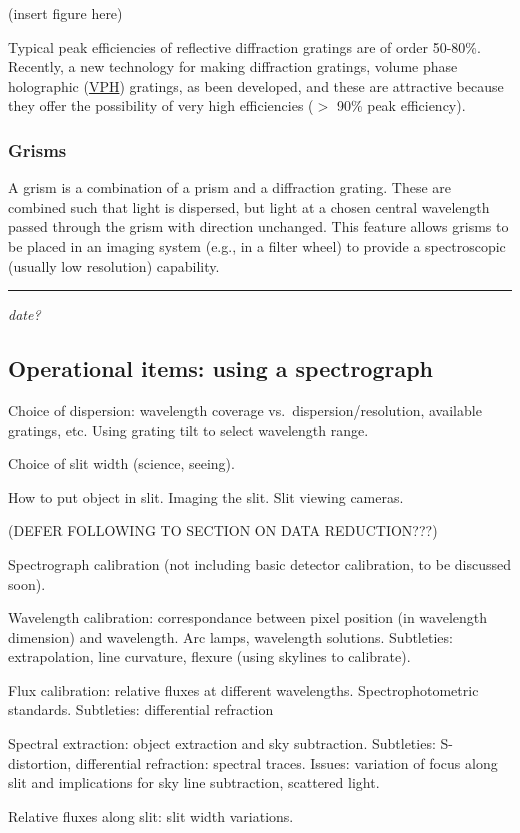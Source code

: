 \documentclass[12pt]{article}
\newcommand{\mydate}[1]{
    \begin{flushright}
        \rule{\textwidth}{0.4pt} %
        \small\hfill\textit{#1}
    \end{flushright}}
\begin{document}
(insert figure here)

Typical peak efficiencies of reflective diffraction gratings are of order
50-80\%. Recently, a new technology for making diffraction gratings, volume
phase holographic (\href{http://www.kosi.com/Holographic_Gratings/vph_ht_overview.php}
{VPH}) gratings, as been developed, and these are attractive because they offer
the possibility of very high efficiencies ($>$ 90\% peak efficiency).

\subsubsection{Grisms}
A grism is a combination of a prism and a diffraction grating. These
are combined such that light is dispersed, but light at a chosen
central wavelength passed through the grism with direction unchanged.
This feature allows grisms to be placed in an imaging system (e.g., in
a filter wheel) to provide a spectroscopic (usually low resolution)
capability.

\mydate{date?}
\subsection{Operational items: using a spectrograph}
Choice of dispersion: wavelength coverage vs.\ dispersion/resolution,
available gratings, etc. Using grating tilt to select wavelength
range.

Choice of slit width (science, seeing).

How to put object in slit. Imaging the slit. Slit viewing cameras.

(DEFER FOLLOWING TO SECTION ON DATA REDUCTION???)

Spectrograph calibration (not including basic detector calibration, to
be discussed soon).

Wavelength calibration: correspondance between pixel position (in
wavelength dimension) and wavelength. Arc lamps, wavelength solutions.
Subtleties: extrapolation, line curvature, flexure (using skylines to
calibrate).

Flux calibration: relative fluxes at different wavelengths.
Spectrophotometric standards. Subtleties: differential refraction

Spectral extraction: object extraction and sky subtraction.
Subtleties: S-distortion, differential refraction: spectral traces.
Issues: variation of focus along slit and implications for sky line
subtraction, scattered light.

Relative fluxes along slit: slit width variations.
\end{document}
